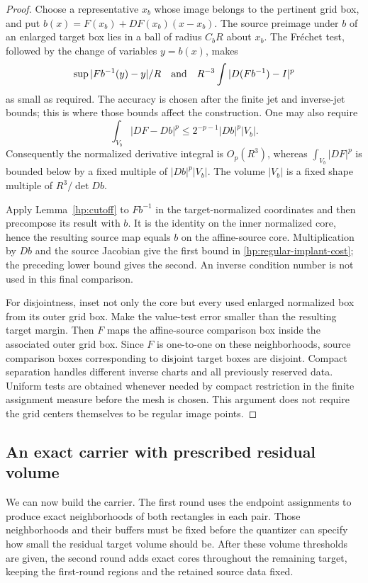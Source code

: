 \documentclass[11pt]{article}
\numberwithin{equation}{section}
\theoremstyle{definition}
\theoremstyle{remark}
\begin{document}
\begin{proof}
Choose a representative $x_b$ whose image belongs to the pertinent
grid box, and put $b(x)=F(x_b)+DF(x_b)(x-x_b)$.  The source preimage
under $b$ of an enlarged target box lies in a ball of radius $C_bR$
about $x_b$.  The Fr\'echet test, followed by the change of variables
$y=b(x)$, makes
\[
 \sup |F b^{-1}(y)-y|/R
 \quad\hbox{and}\quad
 R^{-3}\int|D(F b^{-1})-I|^p
\]
as small as required.  The accuracy is chosen after the finite jet
and inverse-jet bounds; this is where those bounds affect the
construction.  One may also require
\[
 \int_{V_b}|DF-Db|^p
       \leq 2^{-p-1}|Db|^p |V_b|.
\]
Consequently the normalized derivative integral is $O_p(R^3)$,
whereas $\int_{V_b}|DF|^p$ is bounded below by a fixed multiple of
$|Db|^p|V_b|$.  The volume $|V_b|$ is a fixed shape multiple of
$R^3/\det Db$.

Apply Lemma~\ref{hp:cutoff} to $F b^{-1}$ in the target-normalized
coordinates and then precompose its result with $b$.  It is the
identity on the inner normalized core, hence the resulting source
map equals $b$ on the affine-source core.  Multiplication by $Db$
and the source Jacobian give the first bound in
\eqref{hp:regular-implant-cost}; the preceding lower bound gives
the second.  An inverse condition number is not used in this final
comparison.

For disjointness, inset not only the core but every used enlarged
normalized box from its outer grid box.  Make the value-test error
smaller than the resulting target margin.  Then $F$ maps the
affine-source comparison box inside the associated outer grid box.
Since $F$ is one-to-one on these neighborhoods, source comparison
boxes corresponding to disjoint target boxes are disjoint.  Compact
separation handles different inverse charts and all previously
reserved data.  Uniform tests are obtained whenever needed by
compact restriction in the finite assignment measure before the
mesh is chosen.  This argument does not require the grid centers
themselves to be regular image points.
\end{proof}

\subsection{An exact carrier with prescribed residual volume}

We can now build the carrier.  The first round uses the endpoint
assignments to produce exact neighborhoods of both rectangles in each
pair.  Those neighborhoods and their buffers must be fixed before the
quantizer can specify how small the residual target volume should be.
After these volume thresholds are given, the second round adds exact
cores throughout the remaining target, keeping the first-round regions
and the retained source data fixed.
\end{document}
